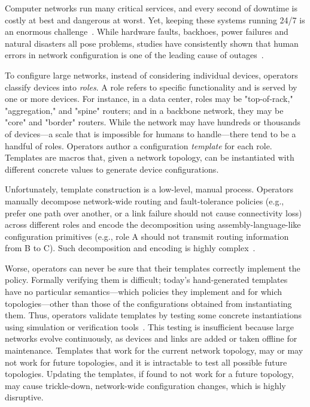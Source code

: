 \documentclass[numbers, 10pt, preprint]{sigplanconf}
\begin{document}


Computer networks run many critical services, and every second of downtime is
costly at best and dangerous at worst.  Yet, keeping these systems
running 24/7 is an enormous
challenge~\cite{mahajan+:bgp-misconfiguration,feamster+:rcc,batfish,dc-failure-study}.
%
While hardware faults, backhoes, power failures and natural disasters all pose
problems, studies have consistently shown that human errors in network
configuration is one of the leading cause of
outages~\cite{juniper-study,xx}.

To configure large networks, instead of considering individual
devices, operators classify devices into {\em roles}. A role refers to
specific functionality and is served by one or more devices. For instance, in a
data center, roles may be "top-of-rack," "aggregation," and "spine"
routers; and in a backbone network, they may be "core" and "border"
routers. While the network may have hundreds or thousands of devices---a scale
that is impossible for humans to handle---there tend to be a handful of roles.
%
Operators author a configuration {\em template} for each role. Templates are
macros that, given a network topology, can be instantiated with different concrete values to generate device configurations.

Unfortunately, template construction is a low-level, manual process. Operators
manually decompose network-wide routing and fault-tolerance policies (e.g.,
prefer one path over another, or a link failure should not cause connectivity loss) across different roles and encode the decomposition using assembly-language-like
configuration primitives (e.g., role A should not transmit routing information
from B to C). Such decomposition and encoding is highly complex~\cite{propane}.

Worse, operators can never be sure that their templates correctly implement the policy. %
Formally verifying them is difficult; today's hand-generated templates have no particular semantics---which policies they implement and for which topologies---other than those of the configurations obtained from instantiating them.
%
Thus, operators validate templates by testing some concrete instantiations using
simulation or verification tools~\cite{x,y}. This testing is insufficient because large networks evolve continuously, as
devices and links are added or taken offline for maintenance. Templates that
work for the current network topology, may or may not work for future
topologies, and it is intractable to test all possible future topologies. Updating the templates, if found to not work for a future topology,
may cause trickle-down, network-wide configuration changes, which is highly
disruptive.
\end{document}

